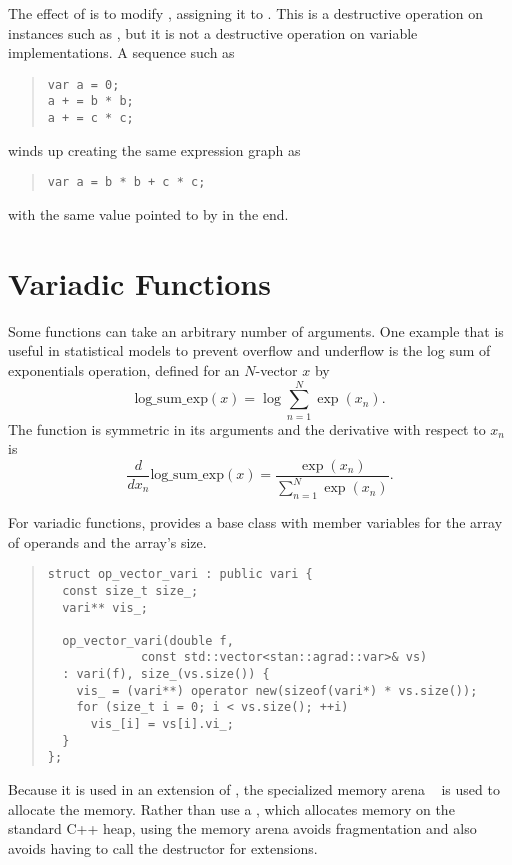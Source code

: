 \documentclass[10pt]{article}
\begin{document}
The effect of  is to modify , assigning it to
.  This is a destructive operation on  instances
such as , but it is not a destructive operation on variable
implementations.  A sequence such as 
%
\begin{quote}
\begin{Verbatim}
var a = 0;
a + = b * b;
a + = c * c;
\end{Verbatim}
\end{quote}
%
winds up creating the same expression graph as
%
\begin{quote}
\begin{Verbatim}
var a = b * b + c * c;
\end{Verbatim}
\end{quote}
%
with the same value pointed to by  in the end.


\section{Variadic Functions}\label{variadic-functions.section}

Some functions can take an arbitrary number of arguments.  One example
that is useful in statistical models to prevent overflow and underflow
is the log sum of exponentials operation, defined for an $N$-vector
$x$ by
%
\[
\mbox{log\_sum\_exp}(x) 
= \log \sum_{n=1}^N \exp(x_n).
\]
%
The function is symmetric in its arguments and the derivative with
respect to $x_n$ is
\[
\frac{d}{d x_n} \mbox{log\_sum\_exp}(x)
= \frac{\exp(x_n)}{\sum_{n=1}^N \exp(x_n)}.
\]

For variadic functions,  provides a base class
with member variables for the array of operands and the array's size.
%
\begin{quote}
\begin{Verbatim}
struct op_vector_vari : public vari {
  const size_t size_;
  vari** vis_;

  op_vector_vari(double f, 
             const std::vector<stan::agrad::var>& vs) 
  : vari(f), size_(vs.size()) {
    vis_ = (vari**) operator new(sizeof(vari*) * vs.size()); 
    for (size_t i = 0; i < vs.size(); ++i)
      vis_[i] = vs[i].vi_;
  }
};
\end{Verbatim}
\end{quote}
%
Because it is used in an extension of , the specialized
memory arena ~ is used to allocate the
memory.  Rather than use a , which allocates memory
on the standard C++ heap, using the memory arena avoids fragmentation
and also avoids having to call the destructor for  extensions.
\end{document}

